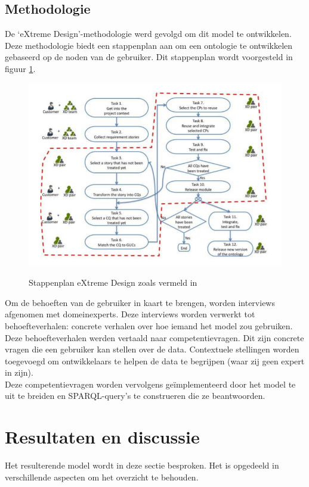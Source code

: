 \documentclass[12pt,journal]{IEEEtran}
\begin{document}
	\subsection{Methodologie}
	\noindent De `eXtreme Design'-methodologie \cite{xd} werd gevolgd om dit model te ontwikkelen. Deze methodologie biedt een stappenplan aan om een ontologie te ontwikkelen gebaseerd op de noden van de gebruiker.
	Dit stappenplan wordt voorgesteld in figuur \ref{fig:xd-diagram}.
	
	\begin{figure}
		\caption[Extreme Design roadmap]{Stappenplan eXtreme Design zoals vermeld in \cite{xd}}
		\centering
		\includegraphics[scale=0.75]{xd-diagram.PNG}
		\label{fig:xd-diagram}
	\end{figure}
	\noindent Om de behoeften van de gebruiker in kaart te brengen, worden interviews afgenomen met domeinexperts. Deze interviews worden verwerkt tot behoefteverhalen: concrete verhalen over hoe iemand het model zou gebruiken.\\
	Deze behoefteverhalen werden vertaald naar competentievragen. Dit zijn concrete vragen die een gebruiker kan stellen over de data.
	Contextuele stellingen worden toegevoegd om ontwikkelaars te helpen de data te begrijpen (waar zij geen expert in zijn).\\
	Deze competentievragen worden vervolgens geïmplementeerd door het model te uit te breiden en SPARQL-query's te construeren die ze beantwoorden.

\section{Resultaten en discussie}
\noindent Het resulterende model wordt in deze sectie besproken. Het is opgedeeld in verschillende aspecten om het overzicht te behouden.
\end{document}
